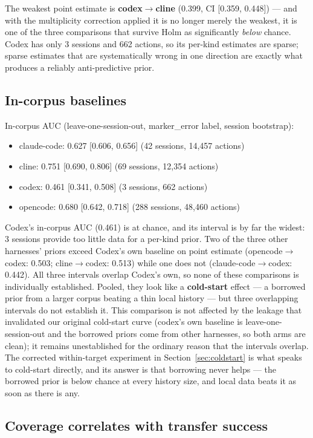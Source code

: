 \documentclass[11pt]{article}
\begin{document}
The weakest point estimate is \textbf{codex$\to$cline} (0.399, CI
[0.359, 0.448]) --- and with the multiplicity correction applied it is no
longer merely the weakest, it is one of the three comparisons that survive
Holm as significantly \emph{below} chance. Codex has only 3 sessions and 662
actions, so its per-kind estimates are sparse; sparse estimates that are
systematically wrong in one direction are exactly what produces a reliably
anti-predictive prior.

\subsection{In-corpus baselines}

In-corpus AUC (leave-one-session-out, marker\_error label, session bootstrap):
\begin{itemize}
\item claude-code: 0.627 [0.606, 0.656] (42 sessions, 14,457 actions)
\item cline: 0.751 [0.690, 0.806] (69 sessions, 12,354 actions)
\item codex: 0.461 [0.341, 0.508] (3 sessions, 662 actions)
\item opencode: 0.680 [0.642, 0.718] (288 sessions, 48,460 actions)
\end{itemize}

Codex's in-corpus AUC (0.461) is at chance, and its interval is by far the
widest: 3 sessions provide too little data for a per-kind prior. Two of the
three other harnesses' priors exceed Codex's own baseline on point estimate
(opencode$\to$codex: 0.503; cline$\to$codex: 0.513) while one does not
(claude-code$\to$codex: 0.442). All three intervals overlap Codex's own, so
none of these comparisons is individually established. Pooled, they look
like a \textbf{cold-start} effect --- a borrowed prior from a larger corpus
beating a thin local history --- but three overlapping intervals do not
establish it. This comparison is not affected by the leakage that
invalidated our original cold-start curve (codex's own baseline is
leave-one-session-out and the borrowed priors come from other harnesses, so
both arms are clean); it remains unestablished for the ordinary reason that
the intervals overlap. The corrected within-target experiment in
Section~\ref{sec:coldstart} is what speaks to cold-start directly, and its
answer is that borrowing never helps --- the borrowed prior is below chance
at every history size, and local data beats it as soon as there is any.

\subsection{Coverage correlates with transfer success}
\label{sec:coverage}
\end{document}
